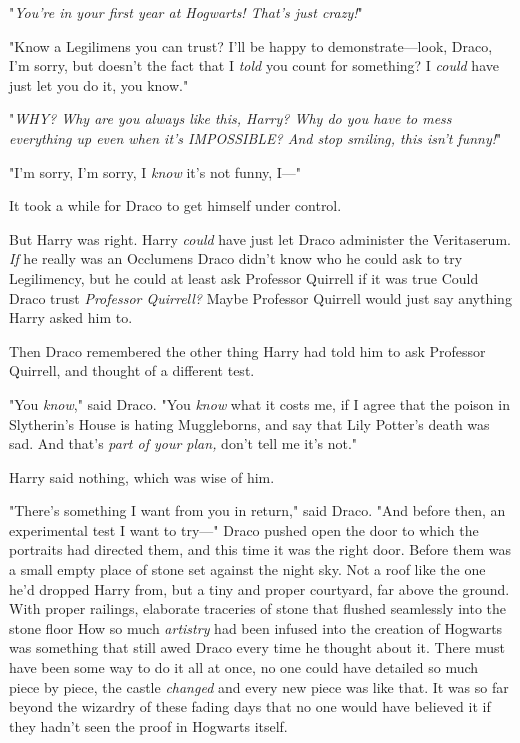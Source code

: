 "\emph{You're in your first year at Hogwarts! That's just crazy!}"

"Know a Legilimens you can trust? I'll be happy to demonstrate---look, Draco,
I'm sorry, but doesn't the fact that I \emph{told} you count for something? I
\emph{could} have just let you do it, you know."

"\emph{WHY? Why are you always like this, Harry? Why do you have to mess
everything up even when it's IMPOSSIBLE? And stop smiling, this isn't funny!}"

"I'm sorry, I'm sorry, I \emph{know} it's not funny, I\mbox{---}"

It took a while for Draco to get himself under control.

But Harry was right. Harry \emph{could} have just let Draco administer the
Veritaserum. \emph{If} he really was an Occlumens{\el} Draco didn't know who
he could ask to try Legilimency, but he could at least ask Professor Quirrell
if it was true{\el} Could Draco trust \emph{Professor Quirrell?} Maybe
Professor Quirrell would just say anything Harry asked him to.

Then Draco remembered the other thing Harry had told him to ask Professor
Quirrell, and thought of a different test.

"You \emph{know}," said Draco. "You \emph{know} what it costs me, if I agree
that the poison in Slytherin's House is hating Muggleborns, and say that Lily
Potter's death was sad. And that's \emph{part of your plan,} don't tell me it's
not."

Harry said nothing, which was wise of him.

"There's something I want from you in return," said Draco. "And before then, an
experimental test I want to try\mbox{---}"
\sbreak
Draco pushed open the door to which the portraits had directed them, and this
time it was the right door. Before them was a small empty place of stone set
against the night sky. Not a roof like the one he'd dropped Harry from, but a
tiny and proper courtyard, far above the ground. With proper railings,
elaborate traceries of stone that flushed seamlessly into the stone
floor{\el} How so much \emph{artistry} had been infused into the creation of
Hogwarts was something that still awed Draco every time he thought about it.
There must have been some way to do it all at once, no one could have detailed
so much piece by piece, the castle \emph{changed} and every new piece was like
that. It was so far beyond the wizardry of these fading days that no one would
have believed it if they hadn't seen the proof in Hogwarts itself.

